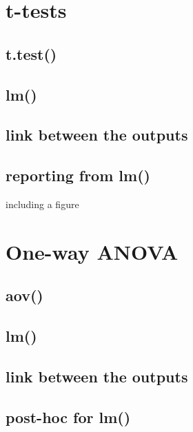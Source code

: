 \documentclass[
]{book}
\begin{document}
\hypertarget{t-tests}{%
\section{t-tests}\label{t-tests}}

\hypertarget{t.test}{%
\subsection{t.test()}\label{t.test}}

\hypertarget{lm}{%
\subsection{lm()}\label{lm}}

\hypertarget{link-between-the-outputs}{%
\subsection{link between the outputs}\label{link-between-the-outputs}}

\hypertarget{reporting-from-lm}{%
\subsection{reporting from lm()}\label{reporting-from-lm}}

including a figure

\hypertarget{one-way-anova}{%
\section{One-way ANOVA}\label{one-way-anova}}

\hypertarget{aov}{%
\subsection{aov()}\label{aov}}

\hypertarget{lm-1}{%
\subsection{lm()}\label{lm-1}}

\hypertarget{link-between-the-outputs-1}{%
\subsection{link between the outputs}\label{link-between-the-outputs-1}}

\hypertarget{post-hoc-for-lm}{%
\subsection{post-hoc for lm()}\label{post-hoc-for-lm}}
\end{document}

